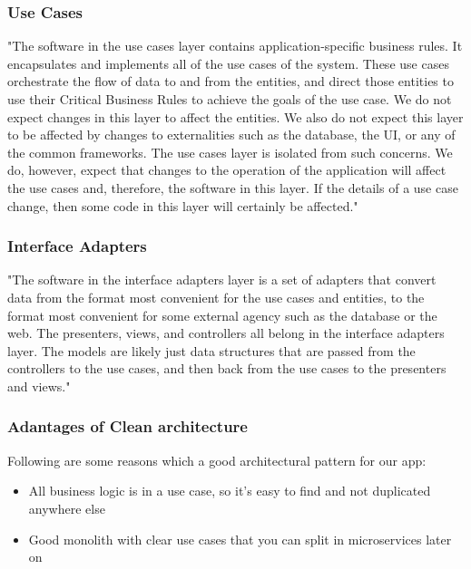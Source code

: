 \subsubsection{Use Cases}
"The software in the use cases layer contains application-specific business rules. It encapsulates and implements all of the use cases of the system. These use cases orchestrate the flow of data to and from the entities, and direct those entities to use their Critical Business Rules to achieve the goals of the use case.
We do not expect changes in this layer to affect the entities. We also do not expect this layer to be affected by changes to externalities such as the database, the UI, or any of the common frameworks. The use cases layer is isolated from such concerns.
We do, however, expect that changes to the operation of the application will affect the use cases and, therefore, the software in this layer. If the details of a use case change, then some code in this layer will certainly be affected." \cite{clean}



\subsubsection{Interface Adapters}
"The software in the interface adapters layer is a set of adapters that convert data from the format most convenient for the use cases and entities, to the format most convenient for some external agency such as the database or
the web. The presenters, views, and controllers all belong in the interface adapters layer. The models are likely just data structures that are passed from the controllers to the use cases, and then back from the use cases to the presenters and views." \cite{clean}



\subsubsection{Adantages of Clean architecture}

Following are some reasons which  a good architectural pattern for our app:
\begin{itemize}
  \item All business logic is in a use case, so it’s easy to find and not duplicated anywhere else
  \item Good monolith with clear use cases that you can split in microservices later on

\end{itemize}



